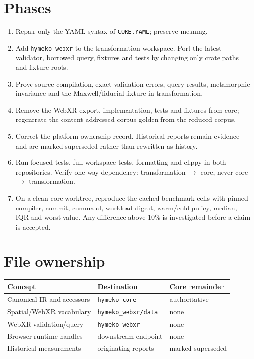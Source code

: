 \documentclass[11pt]{article}
\begin{document}
\section{Phases}
\begin{enumerate}
  \item Repair only the YAML syntax of \texttt{CORE.YAML}; preserve meaning.
  \item Add \texttt{hymeko\_webxr} to the transformation workspace.  Port the
        latest validator, borrowed query, fixtures and tests by changing only
        crate paths and fixture roots.
  \item Prove source compilation, exact validation errors, query results,
        metamorphic invariance and the Maxwell/fiducial fixture in transformation.
  \item Remove the WebXR export, implementation, tests and fixtures from core;
        regenerate the content-addressed corpus golden from the reduced corpus.
  \item Correct the platform ownership record.  Historical reports remain
        evidence and are marked superseded rather than rewritten as history.
  \item Run focused tests, full workspace tests, formatting and clippy in both
        repositories.  Verify one-way dependency: transformation $\rightarrow$
        core, never core $\rightarrow$ transformation.
  \item On a clean core worktree, reproduce the cached benchmark cells with
        pinned compiler, commit, command, workload digest, warm/cold policy,
        median, IQR and worst value.  Any difference above 10\% is investigated
        before a claim is accepted.
\end{enumerate}

\section{File ownership}
\begin{tabular}{@{}lll@{}}
\toprule
Concept & Destination & Core remainder \\
\midrule
Canonical IR and accessors & \texttt{hymeko\_core} & authoritative \\
Spatial/WebXR vocabulary & \texttt{hymeko\_webxr/data} & none \\
WebXR validation/query & \texttt{hymeko\_webxr} & none \\
Browser runtime handles & downstream endpoint & none \\
Historical measurements & originating reports & marked superseded \\
\bottomrule
\end{tabular}
\end{document}
